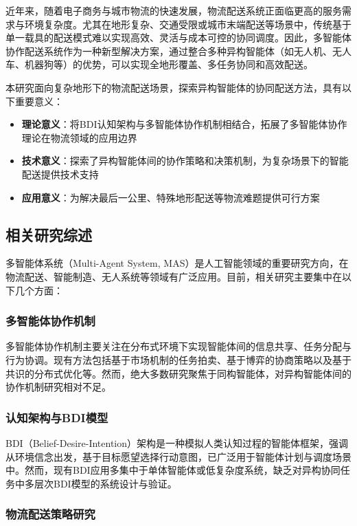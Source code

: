 \documentclass[12pt,a4paper]{article}
\begin{document}
近年来，随着电子商务与城市物流的快速发展，物流配送系统正面临更高的服务需求与环境复杂度。尤其在地形复杂、交通受限或城市末端配送等场景中，传统基于单一载具的配送模式难以实现高效、灵活与成本可控的协同调度。因此，多智能体协作配送系统作为一种新型解决方案，通过整合多种异构智能体（如无人机、无人车、机器狗等）的优势，可以实现全地形覆盖、多任务协同和高效配送。

本研究面向复杂地形下的物流配送场景，探索异构智能体的协同配送方法，具有以下重要意义：

\begin{itemize}
    \item \textbf{理论意义}：将BDI认知架构与多智能体协作机制相结合，拓展了多智能体协作理论在物流领域的应用边界
    \item \textbf{技术意义}：探索了异构智能体间的协作策略和决策机制，为复杂场景下的智能配送提供技术支持
    \item \textbf{应用意义}：为解决最后一公里、特殊地形配送等物流难题提供可行方案
\end{itemize}

\subsection{相关研究综述}

多智能体系统（Multi-Agent System, MAS）是人工智能领域的重要研究方向，在物流配送、智能制造、无人系统等领域有广泛应用。目前，相关研究主要集中在以下几个方面：

\subsubsection{多智能体协作机制}

多智能体协作机制主要关注在分布式环境下实现智能体间的信息共享、任务分配与行为协调。现有方法包括基于市场机制的任务拍卖、基于博弈的协商策略以及基于共识的分布式优化等。然而，绝大多数研究聚焦于同构智能体，对异构智能体间的协作机制研究相对不足。

\subsubsection{认知架构与BDI模型}

BDI（Belief-Desire-Intention）架构\cite{rao1995bdi}是一种模拟人类认知过程的智能体框架，强调从环境信念出发，基于目标愿望选择行动意图，已广泛用于智能体计划与调度场景中。然而，现有BDI应用多集中于单体智能体或低复杂度系统，缺乏对异构协同任务中多层次BDI模型的系统设计与验证。

\subsubsection{物流配送策略研究}
\end{document}
